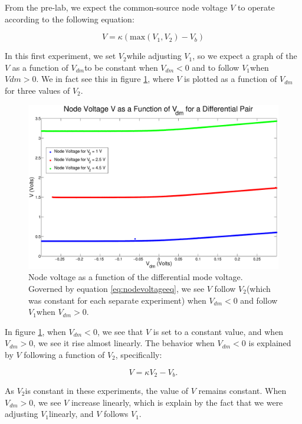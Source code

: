 \documentclass{article}
\newcommand{\Vtwo}{{$V_{2}$}}
\newcommand{\Vone}{{$V_{1}$}}
\newcommand{\Vdm}{{$V_{dm}$}}
\begin{document}
From the pre-lab, we expect the common-source node voltage $V$ to operate according to the following equation:

\begin{equation}
V = \kappa (\textrm{max}(V_1,V_2) - V_b)
\label{eq:nodevoltageeq}
\end{equation}

In this first experiment, we set \Vtwo while adjusting \Vone, so we expect a graph of the $V$ as a function of \Vdm to be constant when $V_{dm} < 0$ and to follow \Vone when $V{dm} > 0$. We in fact see this in figure \ref{fig:nodevoltageWI}, where $V$ is plotted as a function of \Vdm for three values of \Vtwo.

\begin{figure}[H]
\centering
\includegraphics[width=\linewidth]{./Figures/NodeVoltageWeakInversion.eps}
\caption{Node voltage as a function of the differential mode voltage. Governed by equation \ref{eq:nodevoltageeq}, we see $V$ follow \Vtwo (which was constant for each separate experiment) when $V_{dm} < 0$ and follow \Vone when $V_{dm} > 0$.}
\label{fig:nodevoltageWI}
\end{figure}

In figure \ref{fig:nodevoltageWI}, when $V_{dm} < 0$, we see that $V$ is set to a constant value, and when $V_{dm} > 0$, we see it rise almost linearly. The behavior when $V_{dm} < 0$ is explained by $V$ following a function of \Vtwo, specifically:

\begin{equation*}
    V = \kappa V_2 - V_b.
\end{equation*}

As \Vtwo is constant in these experiments, the value of $V$ remains constant. When $V_{dm} > 0$, we see $V$ increase linearly, which is explain by the fact that we were adjusting \Vone linearly, and $V$ follows \Vone.
\end{document}
